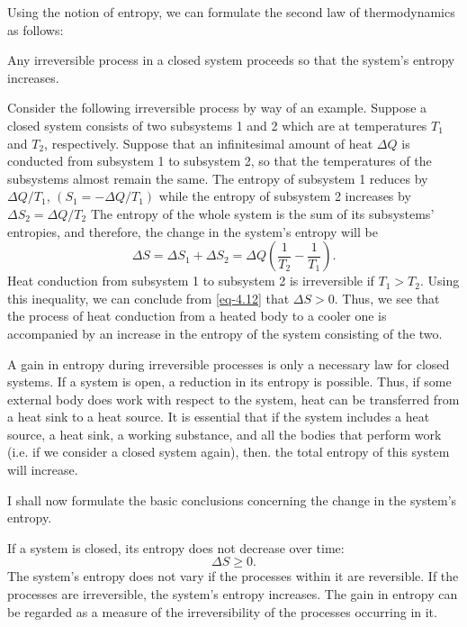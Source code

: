  Using the notion of
entropy, we can formulate the second law of thermodynamics as follows:
\begin{mybox}{}
Any irreversible process in a closed system proceeds so that the system's entropy increases.
\end{mybox}
Consider the following irreversible process by way of an example. Suppose a closed system consists of two subsystems 1 and 2 which are at temperatures $T_{1}$ and $T_{2}$, respectively. Suppose that an infinitesimal amount of heat $\Delta Q$ is conducted from subsystem 1 to subsystem 2, so that the temperatures of the subsystems almost remain the same. The entropy of subsystem 1 reduces by $ \Delta Q/T_{1}$, $(S_{1} = - \Delta Q/T_{1})$ while the entropy of subsystem 2 increases by $\Delta S_{2} = \Delta Q/T_{2}$ The entropy of the whole system is the sum of its subsystems' entropies, and therefore, the change in the system's entropy will be
\begin{equation}%
\Delta S =  \Delta S_{1} + \Delta S_{2} = \Delta Q \left( \frac{1}{T_{2}} - \frac{1}{T_{1}} \right).
\label{eq-4.12}
\end{equation}
Heat conduction from subsystem 1 to subsystem 2 is irreversible if $T_{1} > T_{2}$. Using this inequality, we can conclude from \eqref{eq-4.12} that $\Delta S > 0$. Thus, we see that the process of heat conduction from a heated body to a cooler one is accompanied by an increase in the entropy of the system consisting of the two.

A gain in entropy during irreversible processes is only a necessary law for closed systems. If a system is open, a reduction in its entropy is possible. Thus, if some external body does work with respect to the system, heat can be transferred from a heat sink to a heat source. It is essential that if the system includes a heat source, a heat sink, a working substance, and all the bodies that perform work (i.e. if we consider a closed system again), then. the total entropy of this system will increase.

I shall now formulate the basic conclusions concerning the change in the system's entropy.

 If a system is closed, its entropy does not decrease over time:
\begin{equation}%
\Delta S \geqslant 0.
\label{eq-4.13}
\end{equation}
The system's entropy does not vary if the processes within it are reversible. If the processes are irreversible, the system's entropy increases. The gain in entropy can be regarded as a measure of the irreversibility of the processes occurring in it.


